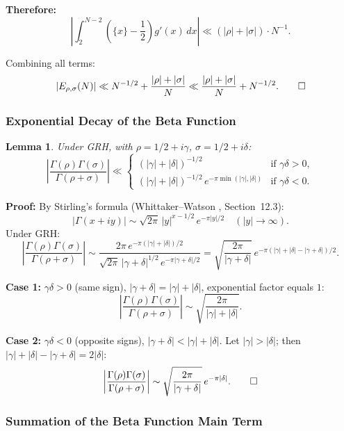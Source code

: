 \documentclass[11pt,a4paper]{article}
\newtheorem{lemma}[theorem]{Lemma}
\theoremstyle{remark}
\begin{document}
\noindent\textbf{Therefore:}
\[
\left|\int_2^{N-2} \left(\{x\} - \frac{1}{2}\right) g'(x)\, dx\right| \ll (|\rho|+|\sigma|)\cdot N^{-1}.
\]

Combining all terms:
\[
|E_{\rho,\sigma}(N)| \ll N^{-1/2} + \frac{|\rho|+|\sigma|}{N} \ll \frac{|\rho|+|\sigma|}{N} + N^{-1/2}. \qed
\]

\subsubsection{Exponential Decay of the Beta Function}

\begin{lemma}\label{lem:betadecay}
Under GRH, with $\rho = 1/2 + i\gamma$, $\sigma = 1/2 + i\delta$:
\begin{equation}\label{eq:betadecay}
\left|\frac{\Gamma(\rho)\Gamma(\sigma)}{\Gamma(\rho+\sigma)}\right| \ll \begin{cases}
(|\gamma|+|\delta|)^{-1/2} & \text{if } \gamma\delta > 0, \\[6pt]
(|\gamma|+|\delta|)^{-1/2}\, e^{-\pi\min(|\gamma|,|\delta|)} & \text{if } \gamma\delta < 0.
\end{cases}
\end{equation}
\end{lemma}

\noindent\textbf{Proof:} By Stirling's formula (Whittaker--Watson \cite{whittaker}, Section~12.3):
\[
|\Gamma(x+iy)| \sim \sqrt{2\pi}\, |y|^{x-1/2}\, e^{-\pi|y|/2} \quad (|y| \to \infty).
\]
Under GRH:
\[
\left|\frac{\Gamma(\rho)\Gamma(\sigma)}{\Gamma(\rho+\sigma)}\right| \sim \frac{2\pi\, e^{-\pi(|\gamma|+|\delta|)/2}}{\sqrt{2\pi}\, |\gamma+\delta|^{1/2}\, e^{-\pi|\gamma+\delta|/2}} = \sqrt{\frac{2\pi}{|\gamma+\delta|}}\, e^{-\pi(|\gamma|+|\delta|-|\gamma+\delta|)/2}.
\]

\noindent\textbf{Case 1:} $\gamma\delta > 0$ (same sign), $|\gamma+\delta| = |\gamma|+|\delta|$, exponential factor equals $1$:
\[
\left|\frac{\Gamma(\rho)\Gamma(\sigma)}{\Gamma(\rho+\sigma)}\right| \sim \sqrt{\frac{2\pi}{|\gamma|+|\delta|}}.
\]

\noindent\textbf{Case 2:} $\gamma\delta < 0$ (opposite signs), $|\gamma+\delta| < |\gamma|+|\delta|$. Let $|\gamma| > |\delta|$; then $|\gamma|+|\delta|-|\gamma+\delta| = 2|\delta|$:
\[
\left|\frac{\Gamma(\rho)\Gamma(\sigma)}{\Gamma(\rho+\sigma)}\right| \sim \sqrt{\frac{2\pi}{|\gamma+\delta|}}\, e^{-\pi|\delta|}. \qed
\]

\subsubsection{Summation of the Beta Function Main Term}
\end{document}
